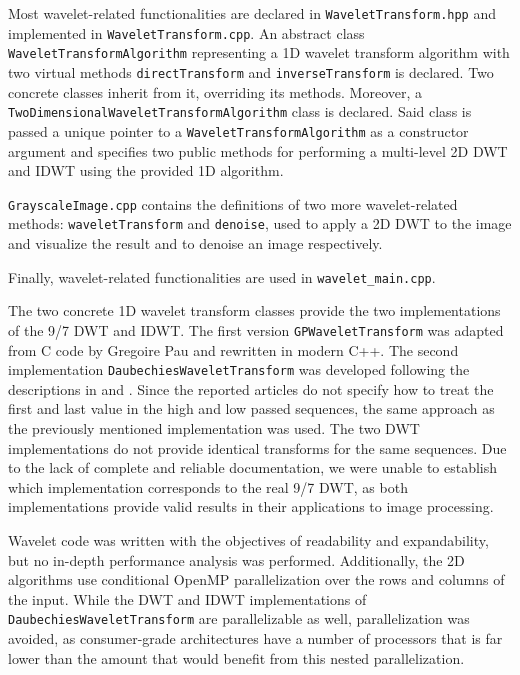 Most wavelet-related functionalities are declared in \texttt{Wavelet\-Transform.hpp} and implemented in \texttt{Wavelet\-Transform.cpp}. An abstract class \texttt{Wavelet\-Trans\-form\-Algorithm} representing a 1D wavelet transform algorithm with two virtual methods \texttt{direct\-Transform} and \texttt{inverse\-Transform} is declared. Two concrete classes inherit from it, overriding its methods. Moreover, a \texttt{Two\-Dimensional\-Wavelet\-Transform\-Algorithm} class is declared. Said class is passed a unique pointer to a \texttt{Wavelet\-Transform\-Algorithm} as a constructor argument and specifies two public methods for performing a multi-level 2D DWT and IDWT using the provided 1D algorithm.

\texttt{Grayscale\-Image.cpp} contains the definitions of two more wavelet-related methods: \texttt{wavelet\-Transform} and \texttt{denoise}, used to apply a 2D DWT to the image and visualize the result and to denoise an image respectively.

Finally, wavelet-related functionalities are used in \texttt{wavelet\_main.cpp}.

The two concrete 1D wavelet transform classes provide the two implementations of the 9/7 DWT and IDWT. The first version \texttt{GP\-Wavelet\-Transform} was adapted from C code by Gregoire Pau\cite{gregoire_pau} and rewritten in modern C++. The second implementation \texttt{Daubechies\-Wavelet\-Transform} was developed following the descriptions in \cite{daubechies} and \cite{wavelet_fast_1}. Since the reported articles do not specify how to treat the first and last value in the high and low passed sequences, the same approach as the previously mentioned implementation was used. The two DWT implementations do not provide identical transforms for the same sequences. Due to the lack of complete and reliable documentation, we were unable to establish which implementation corresponds to the real 9/7 DWT, as both implementations provide valid results in their applications to image processing.

Wavelet code was written with the objectives of readability and expandability, but no in-depth performance analysis was performed. Additionally, the 2D algorithms use conditional OpenMP parallelization over the rows and columns of the input. While the DWT and IDWT implementations of \texttt{Daubechies\-Wavelet\-Transform} are parallelizable as well, parallelization was avoided, as consumer-grade architectures have a number of processors that is far lower than the amount that would benefit from this nested parallelization.

